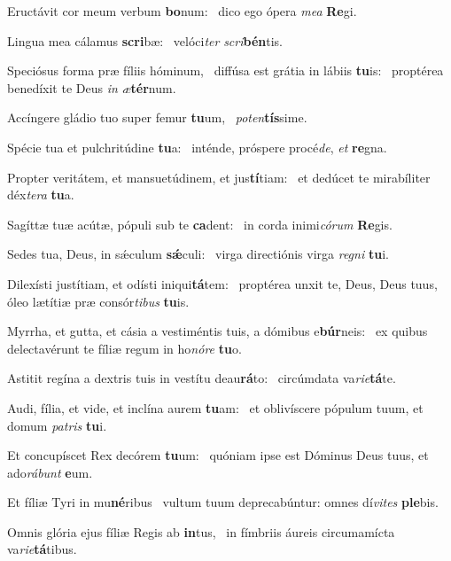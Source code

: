 \item Eructávit cor meum verbum \textbf{bo}num:~\psstar{} dico ego ópera \textit{me}\textit{a} \textbf{Re}gi.
\item Lingua mea cálamus \textbf{scri}bæ:~\psstar{} velóci\textit{ter} \textit{scri}\textbf{bén}tis.
\item Speciósus forma præ fíliis hóminum,~\pscross{} diffúsa est grátia in lábiis \textbf{tu}is:~\psstar{} proptérea benedíxit te Deus \textit{in} \textit{æ}\textbf{tér}num.
\item Accíngere gládio tuo super femur \textbf{tu}um,~\psstar{} \textit{pot}\textit{en}\textbf{tís}sime.
\item Spécie tua et pulchritúdine \textbf{tu}a:~\psstar{} inténde, próspere procé\textit{de}, \textit{et} \textbf{re}gna.
\item Propter veritátem, et mansuetúdinem, et jus\textbf{tí}tiam:~\psstar{} et dedúcet te mirabíliter déx\textit{te}\textit{ra} \textbf{tu}a.
\item Sagíttæ tuæ acútæ, pópuli sub te \textbf{ca}dent:~\psstar{} in corda inimi\textit{có}\textit{rum} \textbf{Re}gis.
\item Sedes tua, Deus, in sǽculum \textbf{sǽ}culi:~\psstar{} virga directiónis virga \textit{re}\textit{gni} \textbf{tu}i.
\item Dilexísti justítiam, et odísti iniqui\textbf{tá}tem:~\psstar{} proptérea unxit te, Deus, Deus tuus, óleo lætítiæ præ consór\textit{ti}\textit{bus} \textbf{tu}is.
\item Myrrha, et gutta, et cásia a vestiméntis tuis, a dómibus e\textbf{búr}neis:~\psstar{} ex quibus delectavérunt te fíliæ regum in ho\textit{nó}\textit{re} \textbf{tu}o.
\item Astitit regína a dextris tuis in vestítu deau\textbf{rá}to:~\psstar{} circúmdata va\textit{ri}\textit{e}\textbf{tá}te.
\item Audi, fília, et vide, et inclína aurem \textbf{tu}am:~\psstar{} et oblivíscere pópulum tuum, et domum \textit{pa}\textit{tris} \textbf{tu}i.
\item Et concupíscet Rex decórem \textbf{tu}um:~\psstar{} quóniam ipse est Dóminus Deus tuus, et ado\textit{rá}\textit{bunt} \textbf{e}um.
\item Et fíliæ Tyri in mu\textbf{né}ribus~\psstar{} vultum tuum deprecabúntur: omnes dí\textit{vi}\textit{tes} \textbf{ple}bis.
\item Omnis glória ejus fíliæ Regis ab \textbf{in}tus,~\psstar{} in fímbriis áureis circumamícta va\textit{ri}\textit{e}\textbf{tá}tibus.
